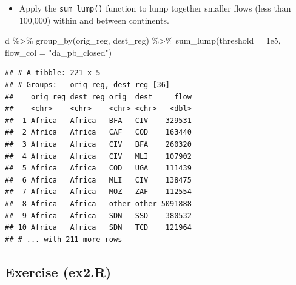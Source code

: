 \documentclass[
]{book}
\newenvironment{Shaded}{\begin{snugshade}}{\end{snugshade}}
\newcommand{\AttributeTok}[1]{\textcolor[rgb]{0.77,0.63,0.00}{#1}}
\newcommand{\FloatTok}[1]{\textcolor[rgb]{0.00,0.00,0.81}{#1}}
\newcommand{\FunctionTok}[1]{\textcolor[rgb]{0.00,0.00,0.00}{#1}}
\newcommand{\NormalTok}[1]{#1}
\newcommand{\SpecialCharTok}[1]{\textcolor[rgb]{0.00,0.00,0.00}{#1}}
\newcommand{\StringTok}[1]{\textcolor[rgb]{0.31,0.60,0.02}{#1}}
\providecommand{\tightlist}{%
  \setlength{\itemsep}{0pt}\setlength{\parskip}{0pt}}
\begin{document}
\begin{itemize}
\tightlist
\item
  Apply the \texttt{sum\_lump()} function to lump together smaller flows (less than 100,000) within and between continents.
\end{itemize}

\begin{Shaded}
\begin{Highlighting}[]
\NormalTok{d }\SpecialCharTok{\%\textgreater{}\%}
  \FunctionTok{group\_by}\NormalTok{(orig\_reg, dest\_reg) }\SpecialCharTok{\%\textgreater{}\%}
  \FunctionTok{sum\_lump}\NormalTok{(}\AttributeTok{threshold =} \FloatTok{1e5}\NormalTok{, }\AttributeTok{flow\_col =} \StringTok{"da\_pb\_closed"}\NormalTok{)}
\end{Highlighting}
\end{Shaded}

\begin{verbatim}
## # A tibble: 221 x 5
## # Groups:   orig_reg, dest_reg [36]
##    orig_reg dest_reg orig  dest     flow
##    <chr>    <chr>    <chr> <chr>   <dbl>
##  1 Africa   Africa   BFA   CIV    329531
##  2 Africa   Africa   CAF   COD    163440
##  3 Africa   Africa   CIV   BFA    260320
##  4 Africa   Africa   CIV   MLI    107902
##  5 Africa   Africa   COD   UGA    111439
##  6 Africa   Africa   MLI   CIV    138475
##  7 Africa   Africa   MOZ   ZAF    112554
##  8 Africa   Africa   other other 5091888
##  9 Africa   Africa   SDN   SSD    380532
## 10 Africa   Africa   SDN   TCD    121964
## # ... with 211 more rows
\end{verbatim}

\hypertarget{exercise-ex2.r}{%
\subsection{Exercise (ex2.R)}\label{exercise-ex2.r}}
\end{document}
